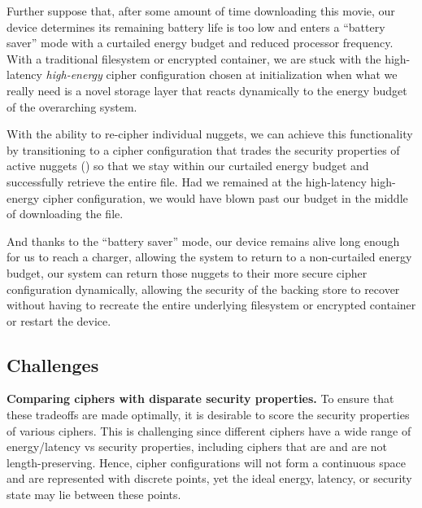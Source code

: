 Further suppose that, after some amount of time downloading this movie, our
device determines its remaining battery life is too low and enters a ``battery
saver'' mode with a curtailed energy budget and reduced processor frequency.
With a traditional filesystem or encrypted container, we are stuck with the
high-latency \emph{high-energy} cipher configuration chosen at initialization
when what we really need is a novel storage layer that reacts dynamically to the
energy budget of the overarching system.

With the ability to re-cipher individual nuggets, we can achieve this
functionality by transitioning to a cipher configuration that trades the
security properties of active nuggets () so that we stay within our
curtailed energy budget and successfully retrieve the entire file. Had we
remained at the high-latency high-energy cipher configuration, we would have
blown past our budget in the middle of downloading the file.

And thanks to the ``battery saver'' mode, our device remains alive long enough
for us to reach a charger, allowing the system to return to a non-curtailed
energy budget, our system can return those nuggets to their more secure cipher
configuration dynamically, allowing the security of the backing store to recover
without having to recreate the entire underlying filesystem or encrypted
container or restart the device.

\subsection{Challenges}

\textbf{Comparing ciphers with disparate security properties.} To ensure that
these tradeoffs are made optimally, it is desirable to score the security
properties of various ciphers. This is challenging since different ciphers have
a wide range of energy/latency vs security properties, including ciphers that
are and are not length-preserving. Hence, cipher configurations will not form a
continuous space and are represented with discrete points, yet the ideal energy,
latency, or security state may lie between these points.

